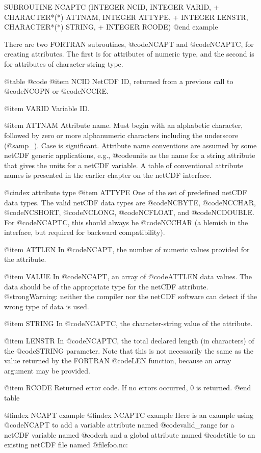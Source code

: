 {      SUBROUTINE NCAPTC (INTEGER NCID, INTEGER VARID,
     +                   CHARACTER*(*) ATTNAM, INTEGER ATTYPE,
     +                   INTEGER LENSTR, CHARACTER*(*) STRING,
     +                   INTEGER RCODE)
@end example

There are two FORTRAN subroutines, @code{NCAPT} and @code{NCAPTC}, for
creating attributes.  The first is for attributes of numeric type, and
the second is for attributes of character-string type.

@table @code
@item NCID
NetCDF ID, returned from a previous call to @code{NCOPN} or @code{NCCRE}.

@item VARID
Variable ID.

@item ATTNAM
Attribute name.  Must begin with an alphabetic character, followed by
zero or more alphanumeric characters including the underscore
(@samp{_}).  Case is significant.  Attribute name conventions are
assumed by some netCDF generic applications, e.g., @code{units} as the
name for a string attribute that gives the units for a netCDF variable.
A table of conventional attribute names is presented in the earlier
chapter on the netCDF interface.

@cindex attribute type
@item ATTYPE
One of the set of predefined netCDF data types.  The valid netCDF data
types are @code{NCBYTE}, @code{NCCHAR}, @code{NCSHORT}, @code{NCLONG},
@code{NCFLOAT}, and @code{NCDOUBLE}.  For @code{NCAPTC}, this should
always be @code{NCCHAR} (a blemish in the interface, but required for
backward compatibility).

@item ATTLEN
In @code{NCAPT}, the number of numeric values provided for the
attribute.

@item VALUE
In @code{NCAPT}, an array of @code{ATTLEN} data values.  The data should
be of the appropriate type for the netCDF attribute.  @strong{Warning:
neither the compiler nor the netCDF software can detect if the wrong
type of data is used.}

@item STRING
In @code{NCAPTC}, the character-string value of the attribute.

@item LENSTR
In @code{NCAPTC}, the total declared length (in characters) of the
@code{STRING} parameter.  Note that this is not necessarily the same as
the value returned by the FORTRAN @code{LEN} function, because an array
argument may be provided.

@item RCODE
Returned error code.  If no errors occurred, 0 is returned.
@end table

@findex NCAPT example
@findex NCAPTC example
Here is an example using @code{NCAPT} to add a variable attribute
named @code{valid_range} for a netCDF variable named @code{rh} and a
global attribute named @code{title} to an existing netCDF file named
@file{foo.nc}:

}
